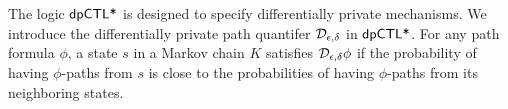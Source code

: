 
The logic $\textsf{dpCTL*}$ is designed to specify differentially private
mechanisms. We introduce the differentially private path quantifer
$\mathcal{D}_{{\epsilon}, {\delta}}$ in $\textsf{dpCTL*}$. For any path formula
$\phi$, a state $s$ in a Markov chain $K$ satisfies
$\mathcal{D}_{{\epsilon}, {\delta}} \phi$ if the probability of having $\phi$-paths
from $s$ is close to the probabilities of
having $\phi$-paths from its neighboring states.

